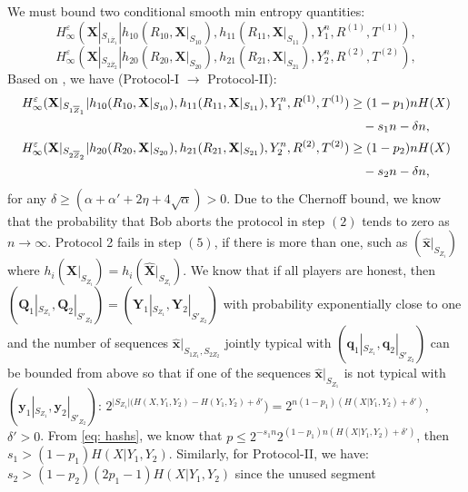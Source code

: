 \documentclass[runningheads]{llncs}
\newcommand{\parbreak}{ \vspace{0.3 em}}
\newcounter{protocol}
\begin{document}
\parbreak We must bound two conditional smooth min entropy quantities:
\begin{equation}\label{eq: first'}
    H^\varepsilon_{\infty}(\mathbf{X}|_{S_{1\overline{Z}_1}}|h_{10}(R_{10}, \mathbf{X}|_{S_{10}}), h_{11}(R_{11}, \mathbf{X}|_{S_{11}}), Y_1^n, R^{(1)}, T^{(1)}),
\end{equation}
\begin{equation}\label{eq: second'}
    H^\varepsilon_{\infty}(\mathbf{X}|_{S_{2\overline{Z}_2}}|h_{20}(R_{20}, \mathbf{X}|_{S_{20}}), h_{21}(R_{21}, \mathbf{X}|_{S_{21}}), Y_2^n, R^{(2)}, T^{(2)}),
\end{equation}
Based on \cite{Winter1}, we have (Protocol-I $\to$ Protocol-II): 
\begin{align*}
    H^\varepsilon_{\infty}(\mathbf{X}|_{S_{1\overline{Z}_1}}|h_{10}(R_{10}, \mathbf{X}|_{S_{10}}), h_{11}(R_{11}, \mathbf{X}|_{S_{11}}), Y_1^n, R^{(1)}, T^{(1)}) &\geq (1-p_1)nH(X)\notag\\
    & \quad- s_1 n - \delta n,\\
    H^\varepsilon_{\infty}(\mathbf{X}|_{S_{2\overline{Z}_2}}|h_{20}(R_{20}, \mathbf{X}|_{S_{20}}), h_{21}(R_{21}, \mathbf{X}|_{S_{21}}), Y_2^n, R^{(2)}, T^{(2)}) &\geq (1-p_2)nH(X)\notag\\
    & \quad - s_2 n - \delta n,
\end{align*}
for any $\delta \geq (\alpha+\alpha' + 2\eta +4\sqrt{\alpha})> 0$. Due to the Chernoff bound, we know that the probability that Bob aborts the protocol in step $(2)$ tends to zero as $n\rightarrow \infty$. Protocol 2 fails in step $(5)$, if there is more than one, such as $(\hat{\mathbf{x}}|_{S_{Z_i}})$ where $h_i(\mathbf{X}|_{S_{Z_i}}) = h_i(\hat{\mathbf{X}}|_{S_{Z_i}})$. We know that if all players are honest, then $(\mathbf{Q}_1|_{S_{Z_1}},\mathbf{Q}_2|_{S'_{Z_2}}) =( \mathbf{Y}_1|_{S_{Z_1}},\mathbf{Y}_2|_{S'_{Z_2}})$ with probability exponentially close to one and the number of sequences $\hat{\mathbf{x}}|_{S_{1Z_1},S_{2Z_2}}$ jointly typical with $(\mathbf{q}_1|_{S_{Z_1}},\mathbf{q}_2|_{S'_{Z_2}})$ can be bounded from above so that if one of the sequences $\hat{\mathbf{x}}|_{S_{Z_1}}$ is not typical with $(\mathbf{y}_1|_{S_{Z_{1}}}, \mathbf{y}_2|_{S'_{Z_2} })$: $2^{\lvert S_{Z_1} \rvert(H(X,Y_1,Y_2)- H({Y_1,Y_2})+ \delta'}) =  2^{n(1-p_1)(H(X|Y_1,Y_2)+\delta')}$, $\delta'>0$. From \eqref{eq: hashs}, we know that $p\leq 2^{-s_1n}2^{(1-p_1)n(H(X|Y_1,Y_2)+\delta')}$, then $s_1 > (1-p_1) H(X|Y_1,Y_2)$. Similarly, for Protocol-II, we have: $s_2 > (1-p_2)(2p_1-1) H(X|Y_1,Y_2)$ since the unused segment
\end{document}

